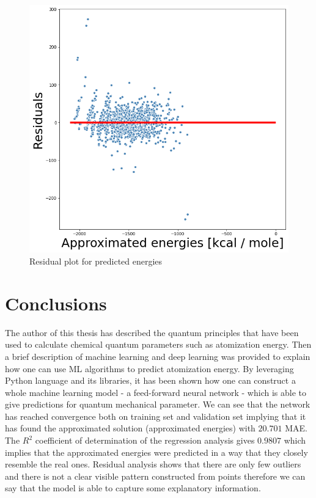 \documentclass[a4paper,oneside,openright,11pt]{book}
\begin{document}
\begin{figure}[h!]
\centering
\includegraphics[scale=0.7]{DocumentFigures/ZdjeciaWalidacja/ResidualsTest.png}
\caption{Residual plot for predicted energies}
\end{figure}




\section{Conclusions}

The author of this thesis has described the quantum principles that have been used to calculate chemical quantum parameters such as atomization energy. Then a brief description of machine learning and deep learning was provided to explain how one can use ML algorithms to predict atomization energy. By leveraging Python language and its libraries, it has been shown how one can construct a whole machine learning model - a feed-forward neural network - which is able to give predictions for quantum mechanical parameter. We can see that the network has reached convergence both on training set and validation set implying that it has found the approximated solution (approximated energies) with $20.701$ MAE. The $R^2$ coefficient of determination of the regression analysis gives $0.9807$ which implies that the approximated energies were predicted in a way that they closely resemble the real ones. Residual analysis shows that there are only few outliers and there is not a clear visible pattern constructed from points therefore we can say that the model is able to capture some explanatory information.
\end{document}
